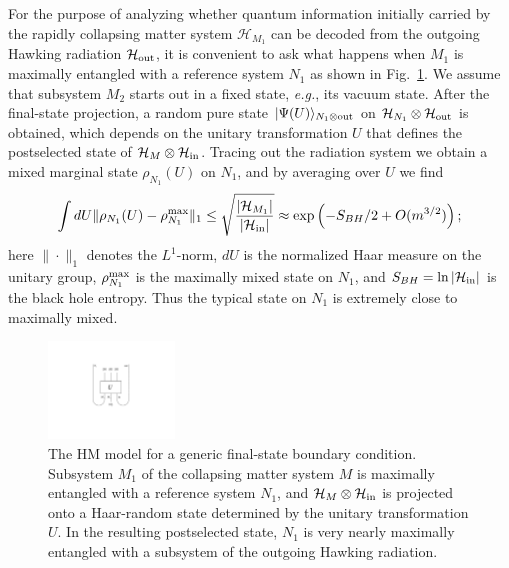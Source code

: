 \documentclass[11pt]{article}
\begin{document}
For the purpose of analyzing whether quantum information initially carried by the rapidly collapsing matter system $\mathcal{H}_{M_1}$ can be decoded from the outgoing Hawking radiation $\mathcal{H}_{\rm out}$, it is convenient to ask what happens when $M_1$ is maximally entangled with a reference system $N_1$ as shown in Fig.~\ref{fig:generic}. We assume that subsystem $M_2$ starts out in a fixed state, {\em e.g.}, its vacuum state. After the final-state projection, a random pure state $|\Psi(U)\rangle_{N_1\otimes{\rm out}}$ on $\mathcal{H}_{N_1}\otimes \mathcal{H}_{\rm out}$ is obtained, which depends on the unitary transformation $U$ that defines the postselected state of $\mathcal{H}_{M}\otimes \mathcal{H}_{\rm in}$. Tracing out the radiation system we obtain a mixed marginal state $\rho_{N_1}(U)$ on $N_1$, and by averaging over $U$ we find \cite{decoupling}
\begin{eqnarray}
\int dU \|\rho_{N_1}(U)-\rho_{N_1}^{\rm max}  \|_1 \le \sqrt{\frac{|\mathcal{H}_{M_1}|}{|\mathcal{H}_{\rm in}|}}\approx \exp\left(-S_{BH}/2+O(m^{3/2})\right);
\end{eqnarray}
here $\|\cdot\|_1$ denotes the $L^1$-norm, $dU$ is the normalized Haar measure on the unitary group, $\rho_{N_1}^{\rm max}$ is the maximally mixed state on $N_1$, and $S_{BH}=\ln |\mathcal{H}_{\rm in}|$ is the black hole entropy. Thus the typical state on $N_1$ is extremely close to maximally mixed.

\begin{figure}[t]
\begin{center}
\includegraphics[width=0.3\textwidth]{generic.pdf}
\end{center}
\caption{The HM model for a generic final-state boundary condition. Subsystem $M_1$ of the collapsing matter system $M$ is maximally entangled with a reference system $N_1$, and $\mathcal{H}_{M}\otimes \mathcal{H}_{\rm in}$ is projected onto a Haar-random state determined by the unitary transformation $U$. In the resulting postselected state, $N_1$ is very nearly maximally entangled with a subsystem of the outgoing Hawking radiation.}
\label{fig:generic}
\end{figure}
\end{document}
